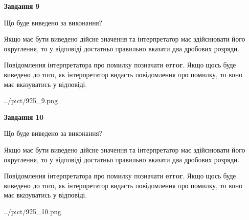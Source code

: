 \documentclass[12pt, ukrainian]{article}
\begin{document}
{\begin {Large}
{\begin {center}\textbf{Завдання 9}\end {center}}\par
Що буде виведено за виконання? \par

Якщо має бути виведено дійсне значення та інтерпретатор має здійснювати його округлення, 
то у відповіді достатньо правильно вказати два дробових розряди.

Повідомлення інтерпретатора про помилку позначати \textbf{error}.
Якщо щось буде виведено до того, як інтерпретатор видасть повідомлення про помилку, 
то воно має вказуватись у відповіді. \par

\begin{center}
	{../pict/925_9.png}
\end{center}
\newpage

{\begin {center}\textbf{Завдання 10}\end {center}}\par
Що буде виведено за виконання? \par

Якщо має бути виведено дійсне значення та інтерпретатор має здійснювати його округлення, 
то у відповіді достатньо правильно вказати два дробових розряди.

Повідомлення інтерпретатора про помилку позначати \textbf{error}.
Якщо щось буде виведено до того, як інтерпретатор видасть повідомлення про помилку, 
то воно має вказуватись у відповіді. \par

\begin{center}
	{../pict/925_10.png}
\end{center}
\newpage

\end {Large}}
\end{document}
